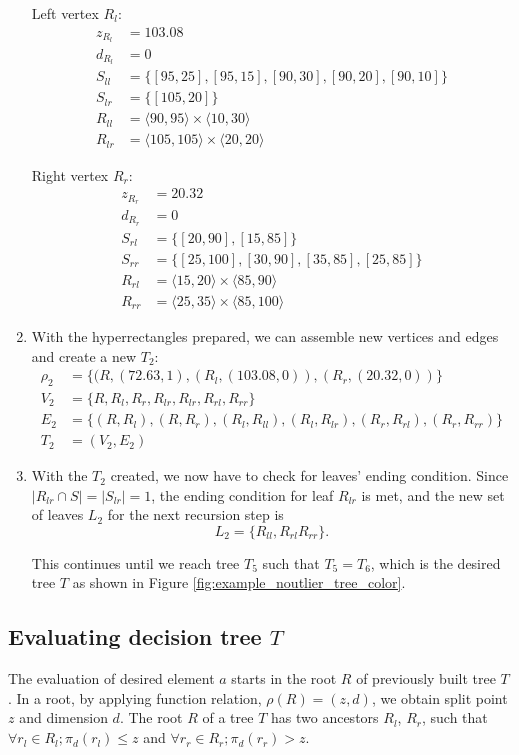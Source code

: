 \begin{example}
\begin{enumerate}
Left vertex $R_l$:
\begin{align*}
z_{R_l} &= 103.08\\
d_{R_l} &= 0\\
S_{ll} &= \{[95,25],[95,15],[90,30],[90,20],[90,10]\}\\
S_{lr} &= \{[105,20]\}\\
R_{ll} &= \langle 90, 95 \rangle \times \langle 10, 30\rangle\\
R_{lr} &= \langle 105, 105 \rangle \times \langle 20, 20\rangle
\end{align*}

Right vertex $R_r$:
\begin{align*}
z_{R_r}&= 20.32\\
d_{R_r}&= 0\\
S_{rl}&= \{[20,90],[15,85]\}\\
S_{rr}&= \{[25,100],[30,90],[35,85],[25,85]\}\\
R_{rl}&= \langle 15, 20 \rangle \times \langle 85, 90 \rangle\\
R_{rr}&= \langle 25, 35 \rangle \times \langle 85, 100 \rangle
\end{align*}
\item With the hyperrectangles prepared, we can assemble new vertices and edges and create a new $T_2$:
\begin{align*}
\rho_2 &= \{(R,(72.63,1), (R_l, (103.08, 0)), (R_r, (20.32, 0)) \}\\
V_2 &= \{ R, R_l, R_r, R_{lr}, R_{lr}, R_{rl}, R_{rr} \}\\
E_2 &= \{ (R,R_l),(R,R_r), (R_l,R_{ll}), (R_l,R_{lr}), (R_r,R_{rl}), (R_r,R_{rr}) \}\\
T_2 &= (V_2, E_2)
\end{align*}
\item With the $T_2$ created, we now have to check for leaves' ending condition. Since $|R_{lr}\cap S|=|S_{lr}| = 1$, the ending condition for leaf $R_{lr}$ is met, and the new set of leaves $L_2$ for the next recursion step is
$$L_2 = \{R_{ll},R_{rl}R_{rr}\}.$$

This continues until we reach tree $T_5$ such that $T_5=T_6$, which is the desired tree $T$ as shown in Figure \ref{fig:example_noutlier_tree_color}. 

\end{enumerate}

\end{example}


\subsection{Evaluating decision tree $T$}
The evaluation of desired element $a$ starts in the root $R$ of previously built tree $T$.
In a root, by applying function relation, $\rho(R) = (z,d)$, we obtain split point $z$ and dimension $d$.
The root $R$ of a tree $T$ has two ancestors $R_l$, $R_r$, such that
$\forall r_l\in R_l; \pi_d(r_l) \le z$ and $\forall r_r\in R_r; \pi_d(r_r)  > z$.

